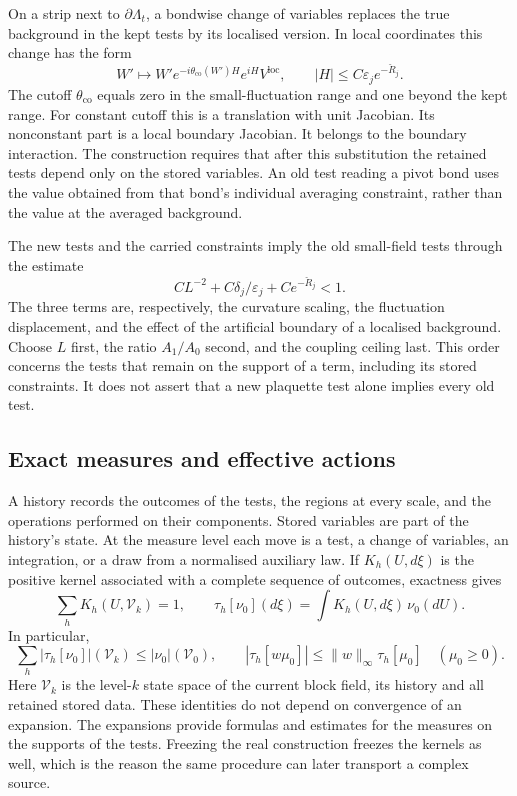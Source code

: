\documentclass[11pt,letterpaper,reqno]{amsart}
\theoremstyle{definition}
\theoremstyle{remark}
\begin{document}
On a strip next to $\partial\Lambda_t$, a bondwise
change of variables replaces the true background in the
kept tests by its localised version. In local coordinates
this change has the form
\[
 W'\longmapsto
 W'e^{-i\theta_{\mathrm{co}}(W')H}e^{iH}V^{\mathrm{loc}},
       \qquad |H|\le C\varepsilon_j e^{-\check R_j}.
\]
The cutoff $\theta_{\mathrm{co}}$ equals zero in the
small-fluctuation range and one beyond the kept range.
For constant cutoff this is a translation with unit
Jacobian. Its nonconstant part is a local boundary
Jacobian. It belongs to the boundary interaction.
The construction requires that after this substitution
the retained tests depend only on the stored variables.
An old test reading a pivot bond uses the value obtained
from that bond's individual averaging constraint, rather
than the value at the averaged background.

The new tests and the carried constraints imply the old
small-field tests through the estimate
\begin{equation}\label{eq:mrg-test-implication}
 CL^{-2}+C\delta_j/\varepsilon_j
                      +Ce^{-\check R_j}<1.
\end{equation}
The three terms are, respectively, the curvature scaling,
the fluctuation displacement, and the effect of the
artificial boundary of a localised background. Choose $L$
first, the ratio $A_1/A_0$ second, and the coupling ceiling
last. This order concerns the tests that remain on the
support of a term, including its stored constraints. It
does not assert that a new plaquette test alone implies
every old test.

\subsection{Exact measures and effective actions}

A history records the outcomes of the tests, the regions at every
scale, and the operations performed on their components. Stored
variables are part of the history's state. At the measure level each
move is a test, a change of variables, an integration, or a draw from
a normalised auxiliary law. If $K_h(U,d\xi)$ is the positive kernel
associated with a complete sequence of outcomes, exactness gives
\begin{equation}\label{eq:history-kernels}
 \sum_hK_h(U,\mathcal V_k)=1,\qquad
 \tau_h[\nu_0](d\xi)=\int K_h(U,d\xi)\,\nu_0(dU).
\end{equation}
In particular,
\[
 \sum_h|\tau_h[\nu_0]|(\mathcal V_k)\le|\nu_0|(\mathcal V_0),
 \qquad
 |\tau_h[w\mu_0]|\le\|w\|_\infty\tau_h[\mu_0]
 \quad(\mu_0\ge0).
\]
Here $\mathcal V_k$ is the level-$k$ state space of the current
block field, its history and all retained stored data.
These identities do not depend on convergence of an expansion. The
expansions provide formulas and estimates for the measures on the
supports of the tests. Freezing the real construction freezes the
kernels as well, which is the reason the same procedure can later
transport a complex source.
\end{document}
